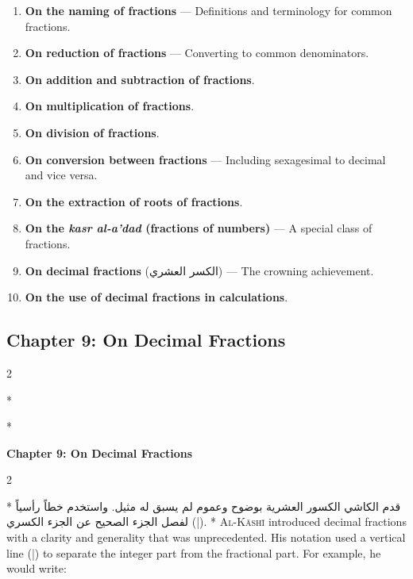 \documentclass[11pt,a4paper]{article}
\newcommand{\ar}[1]{{\arabicfont\beginR #1\endR}}
\newenvironment{bilingual}{%
  \vspace{0.3em}%
  \begin{paracol}{2}%
}{%
  \end{paracol}%
  \vspace{0.3em}%
}
\begin{document}
\begin{enumerate}[label=\textbf{Ch.\arabic*:}]
  \item \textbf{On the naming of fractions} --- Definitions and
  terminology for common fractions.
  \item \textbf{On reduction of fractions} --- Converting to common
  denominators.
  \item \textbf{On addition and subtraction of fractions}.
  \item \textbf{On multiplication of fractions}.
  \item \textbf{On division of fractions}.
  \item \textbf{On conversion between fractions} --- Including sexagesimal
  to decimal and vice versa.
  \item \textbf{On the extraction of roots of fractions}.
  \item \textbf{On the \textit{kasr al-a'dad} (fractions of numbers)} ---
  A special class of fractions.
  \item \textbf{On decimal fractions} (\ar{الكسر العشري}) --- The
  crowning achievement.
  \item \textbf{On the use of decimal fractions in calculations}.
\end{enumerate}

\subsection{Chapter 9: On Decimal Fractions}

\begin{bilingual}
\switchcolumn[0]*
\begin{center}
\textbf{\color{chapcolor}\ar{الباب التاسع في الكسر العشري واستعماله}}
\end{center}
\switchcolumn[1]*
\begin{center}
\textbf{\color{chapcolor}Chapter 9: On Decimal Fractions}
\end{center}
\end{bilingual}

\begin{bilingual}
\switchcolumn[0]*
\ar{قدم الكاشي الكسور العشرية بوضوح وعموم لم يسبق له مثيل. واستخدم خطاً رأسياً (|) لفصل الجزء الصحيح عن الجزء الكسري.}
\switchcolumn[1]*
\lettrine[lines=3, nindent=0em, findent=3pt]{\color{chapcolor}A}{l-K\=ash\=i}
introduced decimal fractions with a clarity and generality that was
unprecedented. His notation used a vertical line (\ar{|}) to separate
the integer part from the fractional part. For example, he would write:
\end{bilingual}
\end{document}
